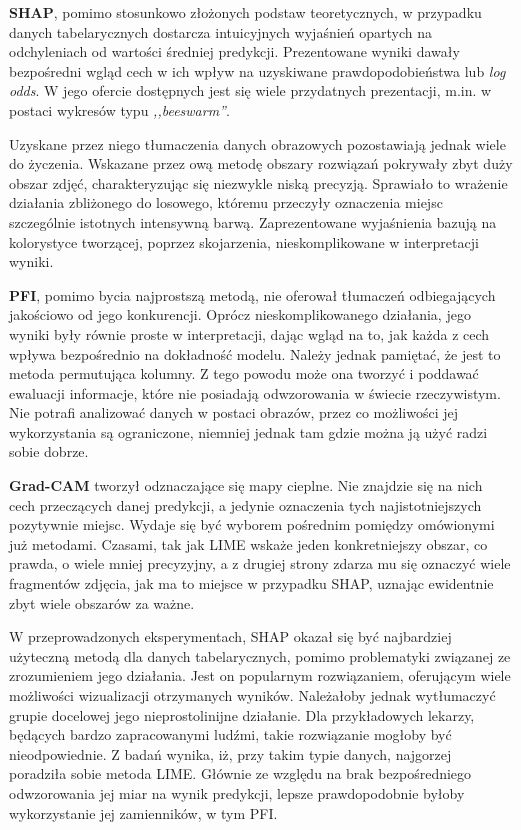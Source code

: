 \textbf{SHAP}, pomimo stosunkowo złożonych podstaw teoretycznych, w przypadku danych tabelarycznych dostarcza intuicyjnych wyjaśnień opartych na odchyleniach od wartości średniej predykcji. Prezentowane wyniki dawały bezpośredni wgląd cech w ich wpływ na uzyskiwane prawdopodobieństwa lub \textit{log odds}. W jego ofercie dostępnych jest się wiele przydatnych prezentacji, m.in. w postaci wykresów typu \textit{,,beeswarm''}. 

Uzyskane przez niego tłumaczenia danych obrazowych pozostawiają jednak wiele do życzenia. Wskazane przez ową metodę obszary rozwiązań pokrywały zbyt duży obszar zdjęć, charakteryzując się niezwykle niską precyzją. Sprawiało to wrażenie działania zbliżonego do losowego, któremu przeczyły oznaczenia miejsc szczególnie istotnych intensywną barwą. Zaprezentowane wyjaśnienia bazują na kolorystyce tworzącej, poprzez skojarzenia, nieskomplikowane w interpretacji wyniki. 

\textbf{PFI}, pomimo bycia najprostszą metodą, nie oferował tłumaczeń odbiegających jakościowo od jego konkurencji. Oprócz nieskomplikowanego działania, jego wyniki były równie proste w interpretacji, dając wgląd na to, jak każda z cech wpływa bezpośrednio na dokładność modelu. Należy jednak pamiętać, że jest to metoda permutująca kolumny. Z tego powodu może ona tworzyć i poddawać ewaluacji informacje, które nie posiadają odwzorowania w świecie rzeczywistym. Nie potrafi analizować danych w postaci obrazów, przez co możliwości jej wykorzystania są ograniczone, niemniej jednak tam gdzie można ją użyć radzi sobie dobrze. 

\textbf{Grad-CAM} tworzył odznaczające się mapy cieplne. Nie znajdzie się na nich cech przeczących danej predykcji, a jedynie oznaczenia tych najistotniejszych pozytywnie miejsc. Wydaje się być wyborem pośrednim pomiędzy omówionymi już metodami. Czasami, tak jak LIME wskaże jeden konkretniejszy obszar, co prawda, o wiele mniej precyzyjny, a z drugiej strony zdarza mu się oznaczyć wiele fragmentów zdjęcia, jak ma to miejsce w przypadku SHAP, uznając ewidentnie zbyt wiele obszarów za ważne.

W przeprowadzonych eksperymentach, SHAP okazał się być najbardziej użyteczną metodą dla danych tabelarycznych, pomimo problematyki związanej ze zrozumieniem jego działania. Jest on popularnym rozwiązaniem, oferującym wiele możliwości wizualizacji otrzymanych wyników. Należałoby jednak wytłumaczyć grupie docelowej jego nieprostolinijne działanie. Dla przykładowych lekarzy, będących bardzo zapracowanymi ludźmi, takie rozwiązanie mogłoby być nieodpowiednie. Z badań wynika, iż, przy takim typie danych, najgorzej poradziła sobie metoda LIME. Głównie ze względu na brak bezpośredniego odwzorowania jej miar na wynik predykcji, lepsze prawdopodobnie byłoby wykorzystanie jej zamienników, w tym PFI.  

